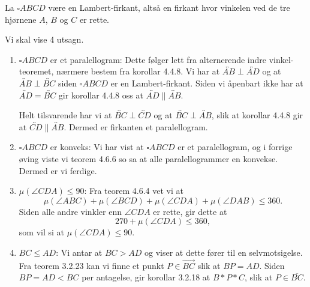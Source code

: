 \begin{oppgave}[4.8.8]
    La $\square ABCD$ være en Lambert-firkant, altså en firkant hvor vinkelen ved de tre hjørnene $A$, $B$ og $C$ er rette. 
    
    \begin{figure}[H]
        \centering
         
    \end{figure}

    Vi skal vise 4 utsagn.
    \begin{enumerate}
        \item $\square ABCD$ er et paralellogram: 
        Dette følger lett fra alternerende indre vinkel-teoremet, nærmere bestem fra korollar 4.4.8. 
        Vi har at $\overleftrightarrow{AB}\perp \overleftrightarrow{AD}$ og at $\overleftrightarrow{AB}\perp \overleftrightarrow{BC}$ siden $\square ABCD$ er en Lambert-firkant. 
        Siden vi åpenbart ikke har at $\overleftrightarrow{AD}=\overleftrightarrow{BC}$ gir korollar 4.4.8 oss at $\overleftrightarrow{AD}\parallel \overleftrightarrow{AB}$. 
        
        Helt tilsvarende har vi at $\overleftrightarrow{BC}\perp\overleftrightarrow{CD}$ og at $\overleftrightarrow{BC}\perp\overleftrightarrow{AB}$, slik at korollar 4.4.8  gir at $\overleftrightarrow{CD}\parallel\overleftrightarrow{AB}$. 
        Dermed er firkanten et paralellogram. 

        \item $\square ABCD$ er konveks: 
        Vi har vist at $\square ABCD$ er et paralellogram, og i forrige øving viste vi teorem 4.6.6 so sa at alle paralellogrammer en konvekse. 
        Dermed er vi ferdige. 

        \item $\mu(\angle CDA)\leq 90$: 
        Fra teorem 4.6.4 vet vi at 
        $$\mu(\angle ABC)+\mu(\angle BCD)+\mu(\angle CDA)+\mu(\angle DAB)\leq 360.$$
        Siden alle andre vinkler enn $\angle CDA$ er rette, gir dette at 
        $$270+\mu(\angle CDA)\leq 360,$$
        som vil si at $\mu(\angle CDA)\leq 90$. 

        \item $BC\leq AD$: 
        Vi antar at $BC> AD$ og viser at dette fører til en selvmotsigelse. 
        Fra teorem 3.2.23 kan vi finne et punkt $P\in \overrightarrow{BC}$ slik at $BP=AD$.
        Siden $BP=AD<BC$ per antagelse, gir korollar 3.2.18 at $B\ast P\ast C$, slik at $P\in \overline{BC}$. 

        \begin{figure}[H]
            \centering
             
        \end{figure}


\end{enumerate}
\end{oppgave}
